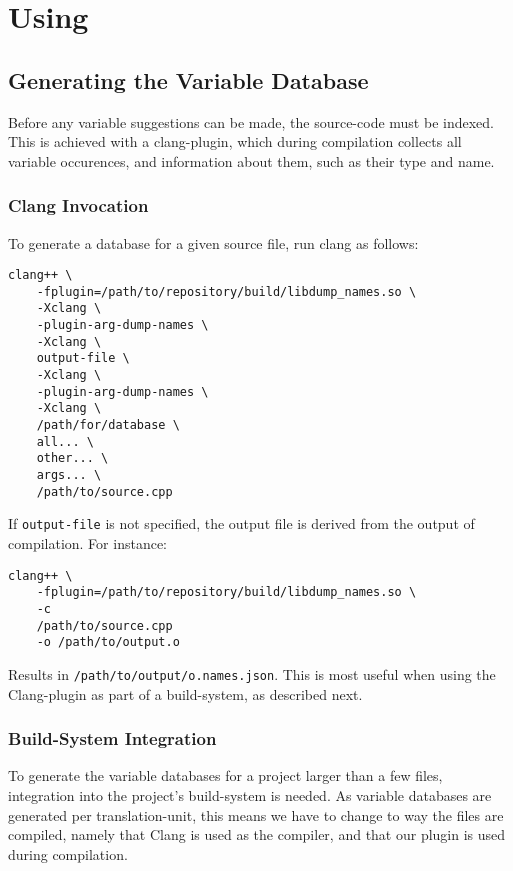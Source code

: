 \section{Using}
\subsection{Generating the Variable Database}
Before any variable suggestions can be made, the source-code must be indexed.
This is achieved with a clang-plugin, which during compilation collects all
variable occurences, and information about them, such as their type and name.

\subsubsection{Clang Invocation}
To generate a database for a given source file, run clang as follows:

\begin{lstlisting}[caption={Invocation of Clang}]
clang++ \
	-fplugin=/path/to/repository/build/libdump_names.so \
	-Xclang \
	-plugin-arg-dump-names \
	-Xclang \
	output-file \
	-Xclang \
	-plugin-arg-dump-names \
	-Xclang \
	/path/for/database \
	all... \
	other... \
	args... \
	/path/to/source.cpp
\end{lstlisting}

If \lstinline|output-file| is not specified, the output file is derived from the
output of compilation. For instance:

\begin{lstlisting}[caption={Invocation of Clang with Defaulted Output Filename}]
clang++ \
	-fplugin=/path/to/repository/build/libdump_names.so \
	-c
	/path/to/source.cpp
	-o /path/to/output.o
\end{lstlisting}

Results in \lstinline|/path/to/output/o.names.json|. This is most useful when
using the Clang-plugin as part of a build-system, as described next.

\subsubsection{Build-System Integration}
To generate the variable databases for a project larger than a few files,
integration into the project's build-system is needed. As variable databases are
generated per translation-unit, this means we have to change to way the \CC{}
files are compiled, namely that Clang is used as the compiler, and that our
plugin is used during compilation.

